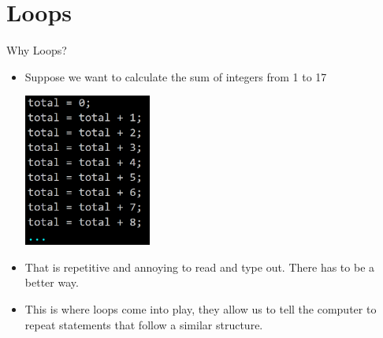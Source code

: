{}\documentclass[letterpaper,
compress,
xcolor=x11names,
]{beamer}
\begin{document}
\section{Loops}

\begin{frame}{Why Loops?}
	\footnotesize
	\begin{itemize}
		\item Suppose we want to calculate the sum of integers from 1 to 17
		\begin{center}
			\includegraphics[height = 5cm]{dumbsum.png}
		\end{center}
		\item That is repetitive and annoying to read and type out. There has to be a better way.
		\item This is where loops come into play, they allow us to tell the computer to repeat statements that follow a similar structure.
	\end{itemize}
\end{frame}

\end{document}
